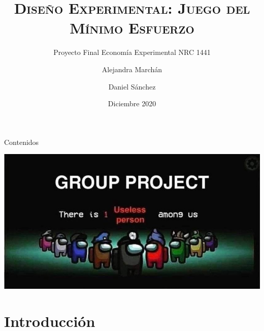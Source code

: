 \documentclass[t,9pt,xcolor=dvipsnames]{beamer}
\title[Proyecto Final: MEG Experimental Modificado]{\textsc{Diseño Experimental: Juego del Mínimo Esfuerzo}}
\subtitle{Proyecto Final Economía Experimental NRC 1441}
\author[Alejandra Marchán \& Daniel Sánchez]{Alejandra Marchán \and Daniel Sánchez}
\institute[USFQ]{Universidad San Francisco de Quito}
\date{Diciembre 2020}
\begin{document}
\begin{frame}
\titlepage
\end{frame}
\begin{frame}{Contenidos}
\begin{minipage}[c]{0.5 \textwidth}
\vspace{0.5cm}
\tableofcontents
\end{minipage}
\begin{minipage}[c]{0.45\textwidth}
\centering 
\includegraphics[scale=0.25]{monjas.jpg}
\end{minipage}
\end{frame}

\section{Introducción}
\end{document}
